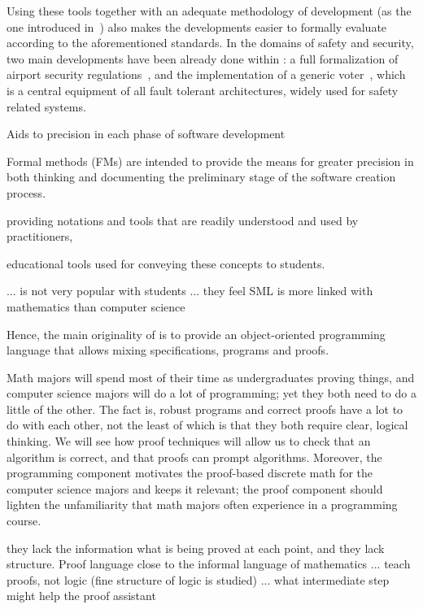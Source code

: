 

Using these tools together
with an adequate methodology of development (as the one introduced
in~\cite{DBLP:journals/entcs/AyraultHP09}) also makes the developments
easier to formally evaluate  according to the aforementioned standards.
In the domains of safety and security, two main developments have been already
done within \focalize: a full formalization of airport security
regulations~\cite{DelahayeED06}, and 
the implementation of
a generic voter~\cite{DBLP:conf/tap/AyraultHP09}, which is a central
equipment of all
fault tolerant architectures, widely used for safety related systems.


Aids to
precision in each phase of software development 

Formal methods (FMs) are intended to provide the means for greater precision in
both thinking and documenting the preliminary stage of the software creation
process.

providing notations and tools that are readily
understood and used by practitioners,



educational tools used for conveying these concepts to students.



... is not very popular with students ... they feel SML is more linked
with mathematics than computer science


Hence, the main originality of \focalize is to provide an
object-oriented programming language that allows mixing
specifications, programs and
proofs.


Math majors will spend most of their time as undergraduates proving
things, and computer science majors will do a lot of programming; yet
they both need to do a little of the other. The fact is,
robust programs and correct proofs have a lot to do with each other,
not the least of which is that they both require clear, logical
thinking. We will see how proof techniques will allow us to check that
an algorithm is correct, and that proofs can prompt
algorithms. Moreover, the programming component motivates the
proof-based discrete math for the computer science majors and keeps it
relevant; the proof component should lighten the unfamiliarity that
math majors often experience in a programming course.


they lack the information what is
being proved at each point, and they lack structure. Proof language
close to the informal language of mathematics ... teach proofs, not
logic (fine structure of logic is studied) ... what intermediate step
might help the proof assistant


